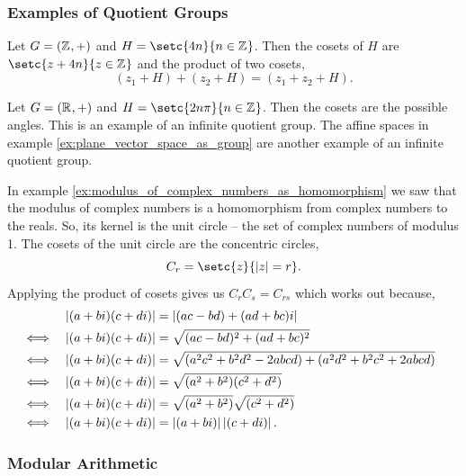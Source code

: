 \documentclass[MathsNotesBase.tex]{subfiles}
\begin{document}
{		\subsubsection{Examples of Quotient Groups}
		\begin{exe}
			\item{Let ${ G = (\mathbb{Z}^{}, +) }$ and ${ H = \setc{4n}{n \in \Z{}} }$. Then the cosets of $H$ are ${ \setc{z + 4n}{z \in \Z{}} }$ and the product of two cosets,
				\[ (z_1 + H) + (z_2 + H) = (z_1 + z_2 + H). \]
			}
			\item{Let ${ G = (\mathbb{R}^{}, +) }$ and ${ H = \setc{2n\pi}{n \in \Z{}} }$. Then the cosets are the possible angles. This is an example of an infinite quotient group. The affine spaces in example \ref{ex:plane_vector_space_as_group} are another example of an infinite quotient group.}
			\medskip
			\item{In example \ref{ex:modulus_of_complex_numbers_as_homomorphism} we saw that the modulus of complex numbers is a homomorphism from complex numbers to the reals. So, its kernel is the unit circle -- the set of complex numbers of modulus 1. The cosets of the unit circle are the concentric circles,
				\[ C_r = \setc{z}{ \abs{z} = r }. \]
			Applying the product of cosets gives us ${ C_rC_s = C_{rs} }$ which works out because,
			\begin{align*}
			&& \left\lvert(a + bi)(c + di)\right\rvert &= \left\lvert(ac - bd) + (ad + bc)i\right\rvert \\
			&\iff & \left\lvert(a + bi)(c + di)\right\rvert &= \sqrt{(ac - bd)^2 + (ad + bc)^2} &\text{\scriptsize{}} \\
			&\iff & \left\lvert(a + bi)(c + di)\right\rvert &= \sqrt{(a^2c^2 + b^2d^2 - 2abcd) + (a^2d^2 + b^2c^2 + 2abcd)} \\
			&\iff & \left\lvert(a + bi)(c + di)\right\rvert &= \sqrt{(a^2 + b^2)(c^2 + d^2)} \\
			&\iff & \left\lvert(a + bi)(c + di)\right\rvert &= \sqrt{(a^2 + b^2)}\sqrt{(c^2 + d^2)} \\
			&\iff & \left\lvert(a + bi)(c + di)\right\rvert &= \left\lvert(a + bi)\right\rvert\left\lvert(c + di)\right\rvert. \\
			\end{align*}
			}
		\end{exe}
	
		
		\bigskip
		\subsubsection{Modular Arithmetic}
	}
	
\end{document}
